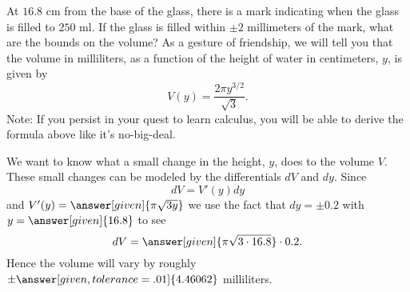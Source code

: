 \documentclass{ximera}
\begin{document}
\begin{example}
  At $16.8$ cm from the base of the glass, there is a mark indicating
  when the glass is filled to $250$ ml. If the glass is filled within
  $\pm 2$ millimeters of the mark, what are the bounds on the volume?
  As a gesture of friendship, we will tell you that the volume in
  milliliters, as a function of the height of water in centimeters, $y$,
  is given by
  \[
  V(y) = \frac{2\pi y^{3/2}}{\sqrt{3}}.
  \]
  Note: If you persist in your quest to learn calculus, you will be
  able to derive the formula above like it's no-big-deal.
  \begin{explanation}
    We want to know what a small change in the height, $y$, does to the
    volume $V$.  These small changes can be modeled by the
    differentials $dV$ and $dy$. Since
    \[
    dV = V'(y) dy
    \]
    and $V'(y) = \answer[given]{\pi \sqrt{3 y}}$ we use the fact that
    $dy = \pm 0.2$ with $y=\answer[given]{16.8}$ to see
    \[
    dV = \answer[given]{\pi \sqrt{3 \cdot 16.8}} \cdot 0.2.
    \]
    Hence the volume will vary by roughly $\pm\answer[given,tolerance=.01]{4.46062}$
    milliliters.
  \end{explanation}
\end{example}
\end{document}

